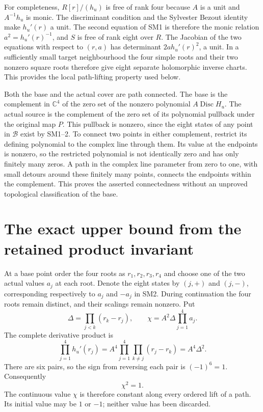 \documentclass[11pt]{article}
\newcommand{\C}{\mathbb C}
\providecommand{\Disc}{\operatorname{Disc}}
\begin{document}
For completeness, $R[r]/(h_u)$ is free of rank four because $A$
is a unit and $A^{-1}h_u$ is monic. The discriminant condition
and the Sylvester Bezout identity make $h_u'(r)$ a unit. The
second equation of SM1 is therefore the monic relation
$a^2=h_u'(r)^{-1}$, and $S$ is free of rank eight over $R$.
The Jacobian of the two equations with respect to $(r,a)$ has
determinant $2a h_u'(r)^2$, a unit. In a sufficiently small target
neighbourhood the four simple roots and their two nonzero square
roots therefore give eight separate holomorphic inverse charts.
This provides the local path-lifting property used below.

Both the base and the actual cover are path connected. The base
is the complement in $\C^4$ of the zero set of the nonzero
polynomial $A\Disc H_u$. The actual source is the complement
of the zero set of its polynomial pullback under the original map
$P$. This pullback is nonzero, since the eight states of any point
in $\mathcal B$ exist by SM1--2. To connect two points in either
complement, restrict its defining polynomial to the complex line
through them. Its value at the endpoints is nonzero, so the
restricted polynomial is not identically zero and has only
finitely many zeros. A path in the complex line parameter from
zero to one, with small detours around these finitely many points,
connects the endpoints within the complement. This proves the
asserted connectedness without an unproved topological
classification of the base.

\section{The exact upper bound from the retained product invariant}
At a base point order the four roots as $r_1,r_2,r_3,r_4$ and
choose one of the two actual values $a_j$ at each root. Denote
the eight states by $(j,+)$ and $(j,-)$, corresponding respectively
to $a_j$ and $-a_j$ in SM2. During continuation the four roots
remain distinct, and their scalings remain nonzero. Put
\[
 \Delta=\prod_{j<k}(r_k-r_j),\qquad
 \chi=A^2\Delta\prod_{j=1}^4a_j.
\]
The complete derivative product is
\[
 \prod_{j=1}^4h_u'(r_j)
 =A^4\prod_{j=1}^4\prod_{k\ne j}(r_j-r_k)
 =A^4\Delta^2.
\]
There are six pairs, so the sign from reversing each pair is
$(-1)^6=1$. Consequently
\begin{equation}
 \chi^2=1.\tag{SM3}
\end{equation}
The continuous value $\chi$ is therefore constant along every
ordered lift of a path. Its initial value may be $1$ or $-1$;
neither value has been discarded.
\end{document}
